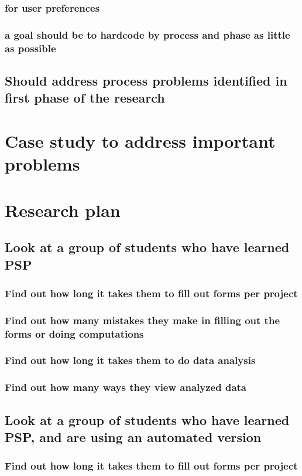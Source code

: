 \subsection{for user preferences}
\subsection{a goal should be to hardcode by process and phase as little as
possible}
\section{Should address process problems identified in first phase of the research}
\chapter{Case study to address important problems}
\chapter{Research plan}
\section{Look at a group of students who have learned PSP}
\subsection{Find out how long it takes them to fill out forms per project}
\subsection{Find out how many mistakes they make in filling out the forms or doing computations}
\subsection{Find out how long it takes them to do data analysis}
\subsection{Find out how many ways they view analyzed data}
\section{Look at a group of students who have learned PSP, and are using an automated version}
\subsection{Find out how long it takes them to fill out forms per project}
